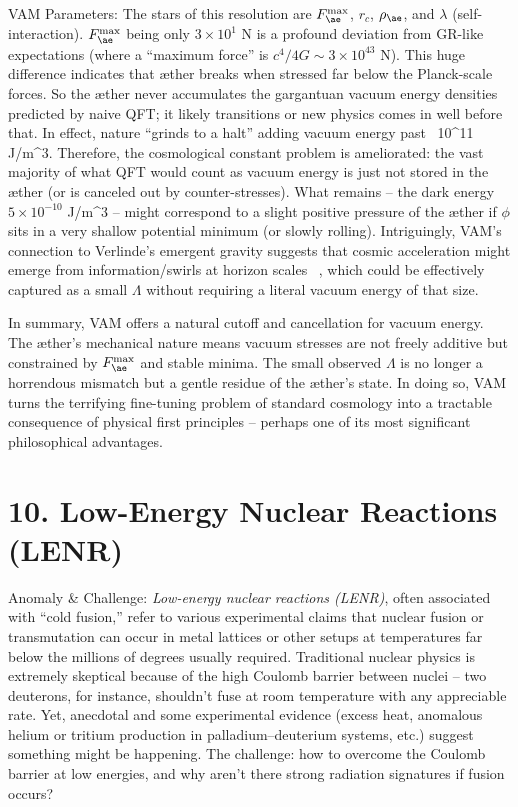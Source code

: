 \documentclass[a4paper, aps,preprint,superscriptaddress, 12pt]{revtex4}
\begin{document}
VAM Parameters: The stars of this resolution are $F_{\ae}^{\max}$, $r_c$, $\rho_{\ae}$, and $\lambda$ (self-interaction). $F_{\ae}^{\max}$ being only $3\times10^1$ N is a profound deviation from GR-like expectations (where a “maximum force” is $c^4/4G \sim 3\times10^{43}$ N). This huge difference indicates that æther breaks when stressed far below the Planck-scale forces. So the æther never accumulates the gargantuan vacuum energy densities predicted by naive QFT; it likely transitions or new physics comes in well before that. In effect, nature “grinds to a halt” adding vacuum energy past ~10^11 J/m^3. Therefore, the cosmological constant problem is ameliorated: the vast majority of what QFT would count as vacuum energy is just not stored in the æther (or is canceled out by counter-stresses). What remains – the dark energy ~ $5\times10^{-10}$ J/m^3 – might correspond to a slight positive pressure of the æther if $\phi$ sits in a very shallow potential minimum (or slowly rolling). Intriguingly, VAM’s connection to Verlinde’s emergent gravity suggests that cosmic acceleration might emerge from information/swirls at horizon scales~\cite{Iskandarani2025c} , which could be effectively captured as a small $\Lambda$ without requiring a literal vacuum energy of that size.


In summary, VAM offers a natural cutoff and cancellation for vacuum energy. The æther’s mechanical nature means vacuum stresses are not freely additive but constrained by $F_{\ae}^{\max}$ and stable minima. The small observed $\Lambda$ is no longer a horrendous mismatch but a gentle residue of the æther’s state. In doing so, VAM turns the terrifying fine-tuning problem of standard cosmology into a tractable consequence of physical first principles – perhaps one of its most significant philosophical advantages.


\section*{10. Low-Energy Nuclear Reactions (LENR)}

Anomaly \& Challenge: \textit{Low-energy nuclear reactions (LENR)}, often associated with “cold fusion,” refer to various experimental claims that nuclear fusion or transmutation can occur in metal lattices or other setups at temperatures far below the millions of degrees usually required. Traditional nuclear physics is extremely skeptical because of the high Coulomb barrier between nuclei – two deuterons, for instance, shouldn’t fuse at room temperature with any appreciable rate. Yet, anecdotal and some experimental evidence (excess heat, anomalous helium or tritium production in palladium–deuterium systems, etc.) suggest something might be happening. The challenge: how to overcome the Coulomb barrier at low energies, and why aren’t there strong radiation signatures if fusion occurs?
\end{document}
